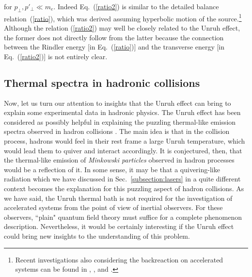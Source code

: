 \documentclass[12pt,nofootinbib,floatfix,aps,prd,showpacs,amsmath,amssymb,eqsecnum]{revtex4-2}
\let\cite\citep
\begin{document}
for $p_\perp,p'_\perp \ll m_e$.
Indeed Eq.~(\ref{ratio2}) is similar to 
the detailed balance 
relation~(\ref{ratio}), which was derived assuming hyperbolic 
motion of the source.\footnote{Recent investigations also considering the
backreaction on accelerated systems can be found in 
\textcite{Parentani95}, \textcite{Parentanietal97}, 
\textcite{Gabrieletal98} and \textcite{Reznik98}.
                } Although the relation (\ref{ratio2}) may well be
closely related to the Unruh effect, the former 
does not directly follow from the latter because the connection between the
Rindler energy [in Eq.~(\ref{ratio})] and the transverse energy
[in Eq.~(\ref{ratio2})] is not entirely clear.


\subsection{Thermal spectra in hadronic collisions}
\label{subsection:hadrons}

Now, let us turn our attention to insights that the Unruh effect
can bring to explain some experimental data in hadronic physics. The 
Unruh effect has been considered as possibly helpful in explaining 
the puzzling thermal-like emission spectra observed in hadron 
collisions \cite{Barshayetal78, Barshayetal80, Kharzeev06}. 
The main idea is that in the collision process, hadrons would feel
in their rest frame a large Unruh temperature, which would lead them to 
quiver and interact accordingly. It is conjectured, then, that the 
thermal-like emission of {\em Minkowski particles} observed in hadron 
processes would be a reflection of it. In some sense, it may be
that a quivering-like radiation which we have discussed in 
Sec.~\ref{subsection:lasers} in a quite different context  
becomes the explanation for this puzzling aspect of hadron
collisions. As we have said, the Unruh thermal bath is not required 
for the investigation of accelerated systems from the point of view 
of inertial observers. For these observers, ``plain" quantum field 
theory must suffice for a complete phenomenon description. 
Nevertheless, it would be certainly interesting if the Unruh effect 
could bring new insights to the understanding of this problem.
\end{document}
